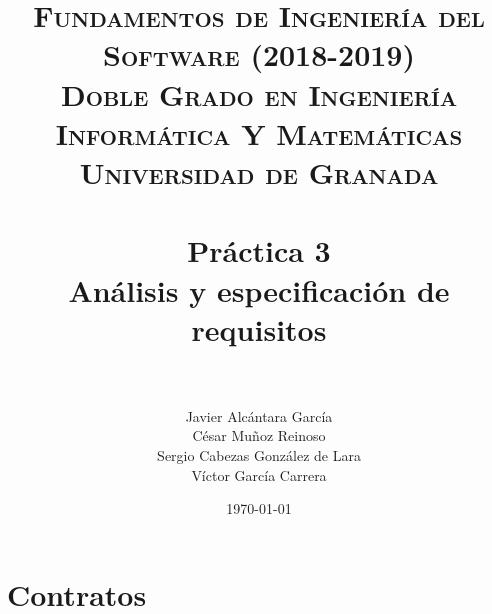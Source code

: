 


\graphicspath{{images/}}


\title{	
\normalfont \normalsize 
\textsc{\textbf{Fundamentos de Ingeniería del Software (2018-2019)} \\ Doble Grado en Ingeniería Informática Y Matemáticas \\ Universidad de Granada} \\ [25pt] %
\horrule{0.5pt} \\[0.4cm] %
\huge \textbf{Práctica 3} \\ Análisis y especificación de requisitos \\ %
\horrule{2pt} \\[0.5cm] %
}

\author{Javier Alcántara García\\ César Muñoz Reinoso \\ Sergio Cabezas González de Lara \\ Víctor García Carrera} %

\date{\normalsize\today} %





\maketitle %

\newpage %

\tableofcontents %

\newpage

\section{Contratos}

